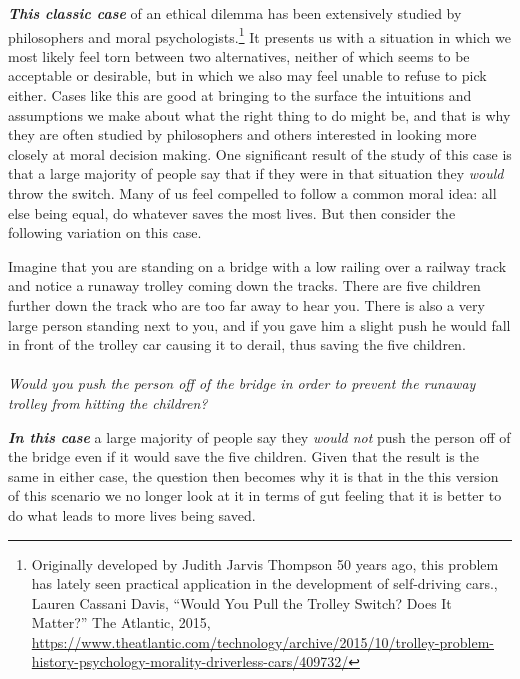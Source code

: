 \documentclass[
  12pt, openany]{book}
\makeatletter
\newenvironment{kframe}{%
\medskip{}
\setlength{\fboxsep}{.8em}
 \def\at@end@of@kframe{}%
 \ifinner\ifhmode%
  \def\at@end@of@kframe{\end{minipage}}%
  \begin{minipage}{\columnwidth}%
 \fi\fi%
 \def\FrameCommand##1{\hskip\@totalleftmargin \hskip-\fboxsep
 \colorbox{shadecolor}{##1}\hskip-\fboxsep
     \hskip-\linewidth \hskip-\@totalleftmargin \hskip\columnwidth}%
 \MakeFramed {\advance\hsize-\width
   \@totalleftmargin\z@ \linewidth\hsize
   \@setminipage}}%
 {\par\unskip\endMakeFramed%
 \at@end@of@kframe}
\newenvironment{rmdblock}[1]
  {
  \begin{itemize}
  \renewcommand{\labelitemi}{
    \raisebox{-.7\height}[0pt][0pt]{
      {\setkeys{Gin}{width=3em,keepaspectratio}\texttt{[image: img/\#1]}}
    }
  }
  \setlength{\fboxsep}{1em}
  \begin{kframe}
  \item
  }
  {
  \end{kframe}
  \end{itemize}
  }
\newenvironment{question}
  {\begin{rmdblock}{question}}
  {\end{rmdblock}}
\theoremstyle{definition}
\theoremstyle{definition}
\theoremstyle{definition}
\theoremstyle{definition}
\theoremstyle{remark}
\makeatother
\begin{document}
\textbf{\emph{This classic case}} of an ethical dilemma has been extensively studied by philosophers and moral psychologists.\footnote{Originally developed by Judith Jarvis Thompson 50 years ago, this problem has lately seen practical application in the development of self-driving cars., Lauren Cassani Davis, ``Would You Pull the Trolley Switch? Does It Matter?'' The Atlantic, 2015, \url{https://www.theatlantic.com/technology/archive/2015/10/trolley-problem-history-psychology-morality-driverless-cars/409732/}} It presents us with a situation in which we most likely feel torn between two alternatives, neither of which seems to be acceptable or desirable, but in which we also may feel unable to refuse to pick either. Cases like this are good at bringing to the surface the intuitions and assumptions we make about what the right thing to do might be, and that is why they are often studied by philosophers and others interested in looking more closely at moral decision making. One significant result of the study of this case is that a large majority of people say that if they were in that situation they \emph{would} throw the switch. Many of us feel compelled to follow a common moral idea: all else being equal, do whatever saves the most lives. But then consider the following variation on this case.

\begin{question}
Imagine that you are standing on a bridge with a low railing over a railway track and notice a runaway trolley coming down the tracks. There are five children further down the track who are too far away to hear you. There is also a very large person standing next to you, and if you gave him a slight push he would fall in front of the trolley car causing it to derail, thus saving the five children.\\
~\\
\emph{Would you push the person off of the bridge in order to prevent the runaway trolley from hitting the children?}

\end{question}

\textbf{\emph{In this case}} a large majority of people say they \emph{would not} push the person off of the bridge even if it would save the five children. Given that the result is the same in either case, the question then becomes why it is that in the this version of this scenario we no longer look at it in terms of gut feeling that it is better to do what leads to more lives being saved.
\end{document}

